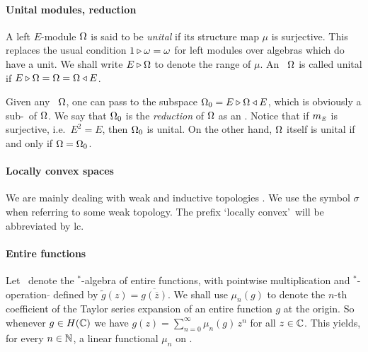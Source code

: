 \paragraph{Unital modules, reduction}
A left $E$-module $\Omega$ is said to be {\em unital\/} if its structure map $\mu$
is surjective. This replaces the usual condition $1\triangleright\omega=\omega$ for left
modules over algebras which do have a unit. We shall write $E \triangleright \Omega$ to
denote the range of $\mu$. An \Ebimod\ $\Omega$ is called unital if $E \triangleright \Omega =
\Omega = \Omega \triangleleft E$.

Given any \Ebimod\ $\Omega$, one can pass to the subspace $\Omega_0 = E \triangleright \Omega
\triangleleft E$, which is obviously a sub-\Ebimod\ of $\Omega$. We say that $\Omega_0$ is
the {\em reduction\/} of $\Omega$ as an \Ebimod\@. Notice that if $m_{\scriptscriptstyle E}$ is
surjective, i.e.\ $E^2=E$, then $\Omega_0$ is unital. On the other hand, $\Omega$
itself is unital if and only if $\Omega=\Omega_0$.

\paragraph{Locally convex spaces}
We are mainly dealing with weak and inductive topologies
\cite{Jarchow,Kothe,Schaefer,Treves}\@. We use the symbol $\sigma$ when
referring to some weak topology. The prefix \lq locally convex\rq\ will be
abbreviated by {\sc lc}\@.


\paragraph{Entire functions}
Let \HC\ denote the $^*$-algebra of entire functions, with pointwise
multiplication and $^*$-operation $\tilde{}$ defined by $\tilde{g}(z) =
\overline{g(\overline{z})}$. We shall use $\mu_n(g)$ to denote the $n$-th
coefficient of the Taylor series expansion of an entire function $g$ at the
origin. So whenever $g \in H(\mathbb{C})$ we have \mbox{$g(z) = \sum_{n=0}^\infty
\mu_n(g)\,z^n$} for all $z\in \mathbb{C}$. This yields, for every $n\in \mathbb{N}$, a linear
functional $\mu_n$ on \HC\@.
